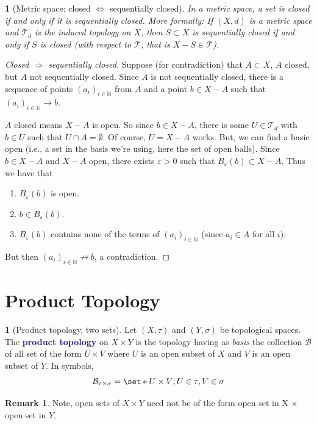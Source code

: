 \documentclass[11pt]{article}
\numberwithin{equation}{section}
\newcommand{\navy}[1]{\textcolor{MidnightBlue}{\bf #1}}
\theoremstyle{plain}
\newtheorem{claim}{\color{ForestGreen}{\textbf{Claim}}}[section]
\theoremstyle{definition}
\newtheorem{definition}{\color{MidnightBlue}{\textbf{Definition}}}[section]
\newtheorem*{remark}{Remark}
\def\Set{\set*}%
\def\ss{\subset}
\def\imp{\Rightarrow}
\newcommand{\1}{\mathbbm 1}
\def\t{\tau}
\newcommand{\e}{\varepsilon}
\newcommand{\NN}{\mathbb N}
\newcommand{\tT}{\mathcal T}
\newcommand{\bB}{\mathcal B}
\begin{document}
\begin{claim}[Metric space: closed $\iff$ sequentially closed]
	In a metric space, a set is closed if and only if it is sequentially closed. More formally: If $(X,d)$ is a metric space and $\tT_d$ is the induced topology on $X$, then $S \ss X$ is sequentially closed if and only if $S$ is closed (with respect to $\tT$, that is $X-S \in \tT$). 
\end{claim}
\begin{proof}[Closed $\imp$ sequentially closed]
	Suppose (for contradiction) that $A \ss X$, $A$ closed, but $A$ not sequentially closed. Since $A$ is not sequentially closed, there is a sequence of points  $(a_i)_{i \in \NN}$ from $A$ and a point $b \in X - A$ such that $(a_i)_{i \in \NN} \to b$.  

	$A$ closed means $X- A$ is open. So since $b \in X-A$, there is some $U \in \tT_d$ with $b \in U$ such that $U \cap A = \emptyset$. Of course, $U = X - A$ works. But, we can find a basic open (i.e., a set in the basis we're using, here the set of open balls). Since $b \in X-A$ and $X-A$ open, there exists $\e> 0$ such that $B_\e(b) \ss X-A$. Thus we have that
	\begin{enumerate}
		\item $B_\e(b)$ is open.
		\item $b \in B_\e(b)$.
		\item $B_\e(b)$ contains none of the terms of  $(a_i)_{i \in \NN}$ (since $a_i \in A$ for all $i$). 
	\end{enumerate}
	But then  $(a_i)_{i \in \NN} \not\to b$, a contradiction.
\end{proof}

\section{Product Topology}
\begin{definition}[Product topology, two sets]
	Let $(X,\t)$ and $(Y,\sigma)$ be topological spaces. The \navy{product topology} on $X \times Y$ is the topology having as \emph{basis} the collection $\bB$ of all set of the form $U \times V$ where $U$ is an open subset of $X$ and $V$ is an open subset of $Y$. In symbols,
	\begin{equation}
		\bB_{\t \times \sigma} = \Set{U \times V; U \in \t, V \in \sigma}
	\end{equation}
\end{definition}

\begin{remark}
	Note, open sets of $X \times Y$ need not be of the form open set in X $\times$ open set in $Y$. 
\end{remark}
\end{document}

